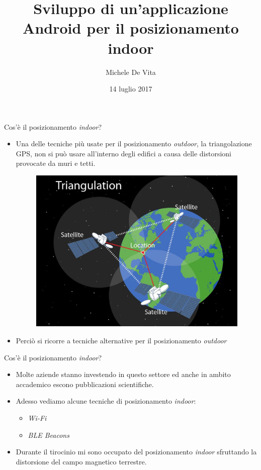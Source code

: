\documentclass[11pt]{beamer}
\begin{document}
	
	\author{Michele De Vita}
	\title{Sviluppo di un'applicazione Android per il posizionamento indoor}
	\date{14 luglio 2017}
	\begin{frame}[plain]
		\maketitle
	\end{frame}
	
	\begin{frame}{Cos'\`e il posizionamento \textit{indoor}?}
		\begin{itemize}
			\item Una delle tecniche pi\`u usate per il posizionamento \textit{outdoor}, la triangolazione GPS, non si pu\`o usare all'interno degli edifici a causa delle distorsioni provocate da muri e tetti.
			\begin{figure}
				\centering
				\includegraphics[width=0.7\linewidth]{img/gps_triangulation}
			\end{figure}
		\item Perci\`o si ricorre a tecniche alternative per il posizionamento \textit{outdoor}
		\end{itemize}
	\end{frame}
	\begin{frame}{Cos'\`e il posizionamento \textit{indoor}?}
		\begin{itemize}
			\item Molte aziende stanno investendo in questo settore ed anche in ambito accademico escono pubblicazioni scientifiche.
			\item Adesso vediamo alcune tecniche di posizionamento \textit{indoor}:
				\begin{itemize}
					\item \textit{Wi-Fi}
					\item \textit{BLE Beacons}
				\end{itemize}
			\item Durante il tirocinio mi sono occupato del posizionamento \textit{indoor} sfruttando la distorsione del campo magnetico terrestre.
		\end{itemize}
	\end{frame}
\end{document}

